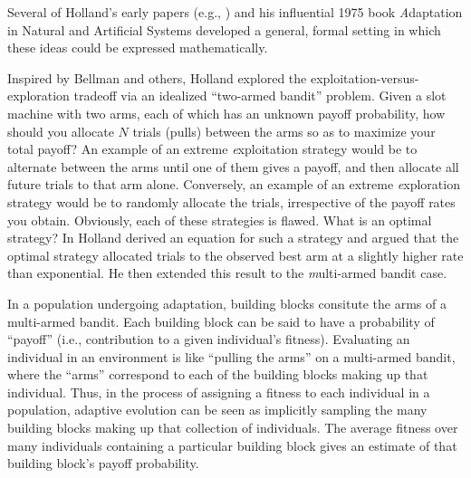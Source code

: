 \documentclass{sig-alternate}
\begin{document}
Several of Holland's early papers (e.g.,
\cite{Holland1962,Holland1973}) and his influential
1975 book {\emph Adaptation in Natural and Artificial Systems}
\cite{Holland1975} developed a general, formal setting in which these ideas
could be expressed mathematically.

Inspired by Bellman \cite{Bellman1961} and
others, Holland explored the exploitation-versus-exploration tradeoff
via an idealized ``two-armed bandit'' problem.  Given a slot machine
with two arms, each of which has an unknown payoff probability, how
should you allocate $N$ trials (pulls) between the arms so as to
maximize your total payoff?  An example of an extreme {\emph
  exploitation} strategy would be to alternate between the arms until
one of them gives a payoff, and then allocate all future trials to
that arm alone.  Conversely, an example of an extreme {\emph
  exploration} strategy would be to randomly allocate the trials,
irrespective of the payoff rates you obtain.  Obviously, each of these
strategies is flawed.  What is an optimal strategy?
In \cite{Holland1973,Holland1975} Holland derived
an equation for such a strategy and argued that the optimal strategy
allocated trials to the observed best arm at a slightly higher rate than
exponential.  
He then extended this 
result to the {\emph multi-armed bandit} case.

In a population undergoing adaptation, building blocks consitute the arms of a multi-armed bandit.  Each
building block can be said to have a probability of ``payoff'' (i.e.,
contribution to a given individual's fitness).  Evaluating an
individual in an environment is like ``pulling the arms'' on a
multi-armed bandit, where the ``arms'' correspond to each of the
building blocks making up that individual.  Thus, in the process of
assigning a fitness to each individual in a population, adaptive
evolution can be seen as implicitly sampling the many building blocks
making up that collection of individuals.  The average fitness over
many individuals containing a particular building block gives an
estimate of that building block's payoff probability.
\end{document}
